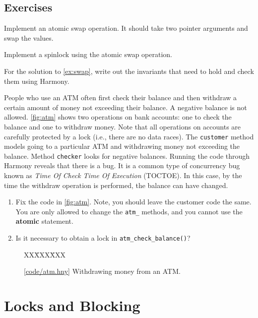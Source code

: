 \documentclass{report}
\newcommand{\harmonysource}[1]{
\begin{tabbing}
XX\=XXX\=XXX\kill
    
\end{tabbing}
}
\newcommand{\harmonylink}[1]{%
[\href{https://www.cs.cornell.edu/home/rvr/harmony/#1}{\underline{#1}}]%
}
\newenvironment{code}{
\tcolorbox
}{
\endtcolorbox
}
\begin{document}
\section*{Exercises}
\begin{problems}
\item Implement an atomic swap operation.  It should take two pointer arguments
and swap the values.
\item \label{ex:swap} Implement a spinlock using the atomic swap operation.
\item For the solution to \autoref{ex:swap},
write out the invariants that need to hold and check them using Harmony.
\item People who use an ATM often first check their balance and then withdraw
a certain amount of money not exceeding their balance.  A negative balance
is not allowed.  \autoref{fig:atm} shows two operations on bank accounts:
one to check the balance and one to withdraw money.
Note that all operations on accounts are carefully protected by a lock
(i.e., there are no data races).
The \texttt{customer}
method models going to a particular ATM and withdrawing money not exceeding
the balance.  Method \texttt{checker} looks for negative balances.
Running the code through Harmony reveals that there is a bug.
It is a common type of concurrency bug known as \emph{Time Of Check Time Of
Execution} (TOCTOE).
In this case, by the time the withdraw operation is performed,
the balance can have changed.
\begin{enumerate}
\item Fix the code in \autoref{fig:atm}.  Note, you should leave the
customer code the same. You are only allowed to change the
\texttt{atm\_} methods, and you cannot use the \textbf{atomic}
statement.
\item Is it necessary to obtain a lock in \texttt{atm\_check\_balance()}?
\end{enumerate}
\end{problems}

\begin{figure}
\begin{code}
\harmonysource{atm}
\end{code}
\caption{\harmonylink{code/atm.hny} Withdrawing money from an ATM.}
\label{fig:atm}
\end{figure}

\chapter{Locks and Blocking}
\label{ch:synch}
%
%
\end{document}

